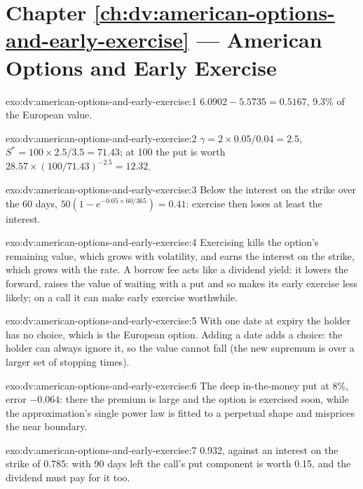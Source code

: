 \section*{Chapter \ref{ch:dv:american-options-and-early-exercise} --- American Options and Early Exercise}

\begin{solution}{exo:dv:american-options-and-early-exercise:1}
$6.0902-5.5735=0.5167$, 9.3\% of the European value.
\end{solution}

\begin{solution}{exo:dv:american-options-and-early-exercise:2}
$\gamma=2\times0.05/0.04=2.5$, $S^*=100\times2.5/3.5=71.43$; at 100 the put is worth
$28.57\times(100/71.43)^{-2.5}=12.32$.
\end{solution}

\begin{solution}{exo:dv:american-options-and-early-exercise:3}
Below the interest on the strike over the 60 days, $50(1-e^{-0.05\times60/365})=0.41$:
exercise then loses at least the interest.
\end{solution}

\begin{solution}{exo:dv:american-options-and-early-exercise:4}
Exercising kills the option's remaining value, which grows with volatility, and earns
the interest on the strike, which grows with the rate. A borrow fee acts like a
dividend yield: it lowers the forward, raises the value of waiting with a put and so makes
its early exercise less likely; on a call it can make early exercise worthwhile.
\end{solution}

\begin{solution}{exo:dv:american-options-and-early-exercise:5}
With one date at expiry the holder has no choice, which is the European option. Adding
a date adds a choice: the holder can always ignore it, so the value cannot fall
(the new supremum is over a larger set of stopping times).
\end{solution}

\begin{solution}{exo:dv:american-options-and-early-exercise:6}
The deep in-the-money put at 8\%, error $-0.064$: there the premium is large and the
option is exercised soon, while the approximation's single power law is fitted to a
perpetual shape and misprices the near boundary.
\end{solution}

\begin{solution}{exo:dv:american-options-and-early-exercise:7}
0.932, against an interest on the strike of 0.785: with 90 days left the call's put
component is worth 0.15, and the dividend must pay for it too.
\end{solution}

